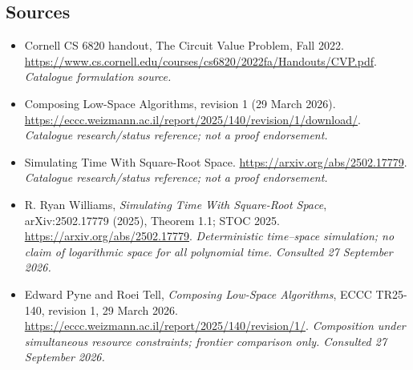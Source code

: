 \documentclass[11pt,a4paper]{article}
\numberwithin{equation}{section}
\begin{document}
\subsection{Sources}
\begin{itemize}\raggedright
\item[\textnormal{[S1]}]\hypertarget{source:30006702:1}{} Cornell CS 6820 handout, The Circuit Value Problem, Fall 2022.
\url{https://www.cs.cornell.edu/courses/cs6820/2022fa/Handouts/CVP.pdf}.
{\small\textit{Catalogue formulation source.}}
\item[\textnormal{[S2]}]\hypertarget{source:30006702:2}{} Composing Low-Space Algorithms, revision 1 (29 March 2026).
\url{https://eccc.weizmann.ac.il/report/2025/140/revision/1/download/}.
{\small\textit{Catalogue research/status reference; not a proof endorsement.}}
\item[\textnormal{[S3]}]\hypertarget{source:30006702:3}{} Simulating Time With Square-Root Space.
\url{https://arxiv.org/abs/2502.17779}.
{\small\textit{Catalogue research/status reference; not a proof endorsement.}}

\item[\textnormal{[E1]}]\hypertarget{extra:30006702:1}{} R. Ryan Williams, \emph{Simulating Time With Square-Root Space}, arXiv:2502.17779 (2025), Theorem 1.1; STOC 2025.
\url{https://arxiv.org/abs/2502.17779}.
{\small\textit{Deterministic time--space simulation; no claim of logarithmic space for all polynomial time. Consulted 27 September 2026.}}
\item[\textnormal{[E2]}]\hypertarget{extra:30006702:2}{} Edward Pyne and Roei Tell, \emph{Composing Low-Space Algorithms}, ECCC TR25-140, revision 1, 29 March 2026.
\url{https://eccc.weizmann.ac.il/report/2025/140/revision/1/}.
{\small\textit{Composition under simultaneous resource constraints; frontier comparison only. Consulted 27 September 2026.}}
\end{itemize}
\end{document}
